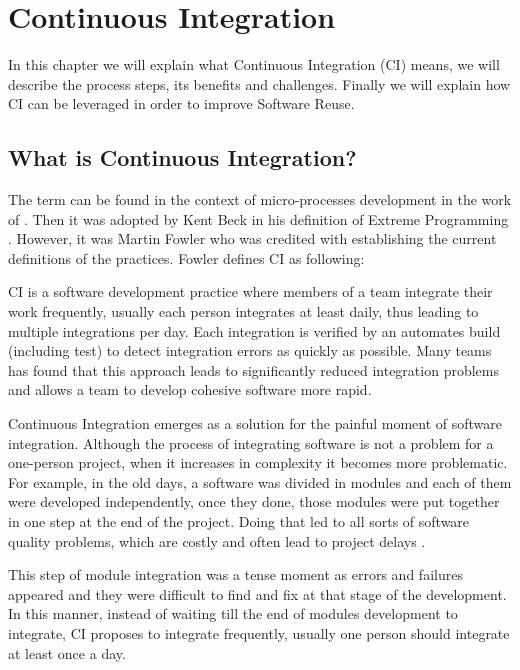 \section{Continuous Integration}
\label{chap:ci}

In this chapter we will explain what Continuous Integration (CI) means, we will describe the process steps, its benefits and challenges. Finally we will explain how CI can be leveraged in order to improve Software Reuse.

\subsection{What is Continuous Integration?}
\label{sec:ci-def}

The term can be found in the context of micro-processes development in the work of \cite{Booch2007}. Then it was adopted by Kent Beck in his definition of Extreme Programming \cite{Beck1999}. However, it was Martin Fowler who was credited with establishing the current definitions of the practices. Fowler defines CI as following:

CI is a software development practice where members of a team integrate their work frequently, usually each person integrates at least daily, thus leading to multiple integrations per day. Each integration is verified by an automates build (including test) to detect integration errors as quickly as possible. Many teams has found that this approach leads to significantly reduced integration problems and allows a team to develop cohesive software more rapid\cite{Fowler2006}.

Continuous Integration emerges as a solution for the painful moment of software integration. Although the process of integrating software is not a problem for a one-person project, when it increases in complexity it becomes more problematic. For example, in the old days, a software was divided in modules and each of them were developed independently, once they done, those modules were put together in one step at the end of the project. Doing that led to all sorts of software quality problems, which are costly and often lead to project delays \cite{Duvall2007}.

This step of module integration was a tense moment as errors and failures appeared and they were difficult to find and fix at that stage of the development. In this manner, instead of waiting till the end of modules development to integrate, CI proposes to integrate frequently, usually one person should integrate at least once a day.

